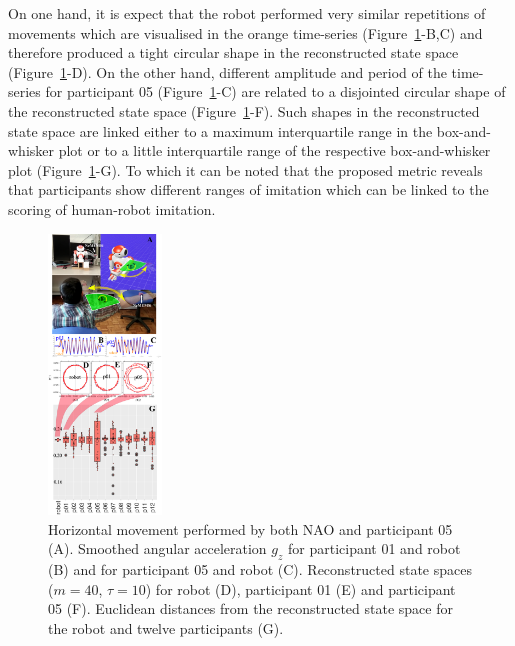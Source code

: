 \documentclass{sig-alternate-05-2015}
\begin{document}
% 


On one hand, it is expect that the robot performed very similar repetitions of movements 
which are visualised in the orange time-series (Figure~\ref{fig:main}-B,C)
and therefore produced a tight circular shape in the reconstructed state space (Figure~\ref{fig:main}-D).
On the other hand, 
different amplitude and period of the time-series for participant 05 (Figure~\ref{fig:main}-C)
are related to a disjointed circular shape of the reconstructed state space (Figure~\ref{fig:main}-F).
Such shapes in the reconstructed state space 
are linked either 
to a maximum interquartile range in the  box-and-whisker plot 
or 
to a little interquartile range of the respective box-and-whisker plot (Figure~\ref{fig:main}-G).
To which it can be noted that the proposed metric reveals that participants show different ranges 
of imitation which can be linked to the scoring of human-robot imitation.







\begin{figure}[ht]
\centering
\includegraphics[width=0.27\textwidth]{fig06}
\caption{
Horizontal movement performed by both NAO and participant 05 (A). 
Smoothed angular acceleration $g_z$ for participant 01  and robot (B)
and for participant 05 and robot (C).
Reconstructed state spaces  ($m=40$, $\tau=10$) for robot (D), participant 01 (E) and participant 05 (F).
Euclidean distances from the reconstructed state space for the robot and twelve participants (G).
}
\label{fig:main}
\end{figure}
\end{document}
